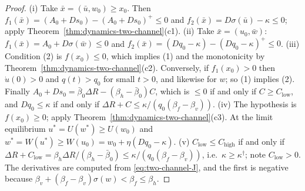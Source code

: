 \begin{proof}
(i) Take $\bar x=(\bar u,w_0)\ge x_0$. Then
$f_1(\bar x)=(A_0+Ds_0)-(A_0+Ds_0)^+\le0$ and
$f_2(\bar x)=D\sigma(\bar u)-\kappa\le0$; apply
Theorem~\ref{thm:dynamics-two-channel}(c1). (ii) Take $\bar x=(u_0,\bar w)$:
$f_1(\bar x)=A_0+D\sigma(\bar w)\le0$ and
$f_2(\bar x)=(Dq_0-\kappa)-(Dq_0-\kappa)^+\le0$. (iii) Condition (2) is
$f(x_0)\le0$, which implies (1) and the monotonicity by
Theorem~\ref{thm:dynamics-two-channel}(c2). Conversely, if $f_1(x_0)>0$
then $\dot u(0)>0$ and $q(t)>q_0$ for small $t>0$, and likewise for $w$; so
(1) implies (2). Finally
$A_0+Ds_0=\bar\beta_0\Delta R-(\beta_h-\bar\beta_0)C$, which is $\le0$ if
and only if $C\ge C_{\mathrm{low}}$, and $Dq_0\le\kappa$ if and only if
$\Delta R+C\le\kappa/(q_0(\beta_f-\beta_v))$. (iv) The hypothesis is
$f(x_0)\ge0$; apply Theorem~\ref{thm:dynamics-two-channel}(c3). At the
limit equilibrium $u^\ast=U(w^\ast)\ge U(w_0)$ and
$w^\ast=W(u^\ast)\ge W(u_0)=w_0+\eta(Dq_0-\kappa)$. (v)
$C_{\mathrm{low}}\le C_{\mathrm{high}}$ if and only if
$\Delta R+C_{\mathrm{low}}=\beta_h\Delta R/(\beta_h-\bar\beta_0)\le\kappa/(q_0(\beta_f-\beta_v))$,
i.e.\ $\kappa\ge\kappa^\dagger$; note $C_{\mathrm{low}}>0$. The derivatives
are computed from \eqref{eq:two-channel-J}, and the first is negative
because $\beta_v+(\beta_f-\beta_v)\sigma(w)<\beta_f\le\beta_h$.
\end{proof}

